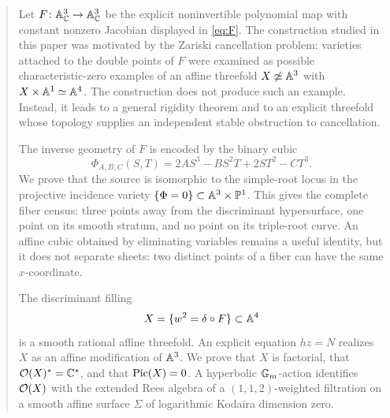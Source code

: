 \maketitle

\begin{abstract}
Let $F\colon\A^3_{\C}\to\A^3_{\C}$ be the explicit noninvertible polynomial map with constant nonzero Jacobian displayed in \eqref{eq:F}.  The construction studied in this paper was motivated by the Zariski cancellation problem: varieties attached to the double points of $F$ were examined as possible characteristic-zero examples of an affine threefold $X\not\simeq\A^3$ with $X\times\A^1\simeq\A^4$.  The construction does not produce such an example.  Instead, it leads to a general rigidity theorem and to an explicit threefold whose topology supplies an independent stable obstruction to cancellation.

The inverse geometry of $F$ is encoded by the binary cubic
\[
  \Phi_{A,B,C}(S,T)=2AS^3-BS^2T+2ST^2-CT^3.
\]
We prove that the source is isomorphic to the simple-root locus in the projective incidence variety $\{\Phi=0\}\subset\A^3\times\Pj^1$.  This gives the complete fiber census: three points away from the discriminant hypersurface, one point on its smooth stratum, and no point on its triple-root curve.  An affine cubic obtained by eliminating variables remains a useful identity, but it does not separate sheets: two distinct points of a fiber can have the same $x$-coordinate.

The discriminant filling
\[
  X=\{w^2=\delta\circ F\}\subset\A^4
\]
is a smooth rational affine threefold.  An explicit equation $hz=N$ realizes $X$ as an affine modification of $\A^3$.  We prove that $X$ is factorial, that $\OO(X)^*=\C^*$, and that $\Pic(X)=0$.  A hyperbolic $\Gm$-action identifies $\OO(X)$ with the extended Rees algebra of a $(1,1,2)$-weighted filtration on a smooth affine surface $\Sigma$ of logarithmic Kodaira dimension zero.


\end{abstract}

